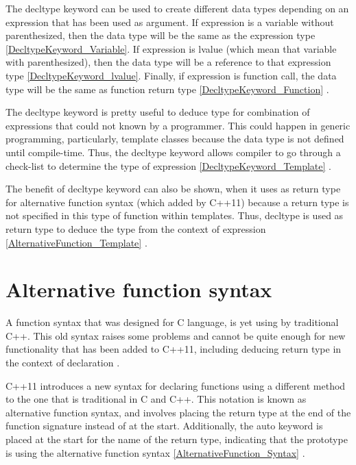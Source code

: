 \documentclass[11pt]{report}
\begin{document}
The decltype keyword can be used to create different data types depending on an expression that has been used as argument.  If expression is a variable without parenthesized, then the data type will be the same as the expression type \ref{DecltypeKeyword_Variable}. If expression is lvalue (which mean that variable with parenthesized), then the data type will be a reference to that expression type \ref{DecltypeKeyword_lvalue}. Finally, if expression is function call, the data type will be the same as function return type \ref{DecltypeKeyword_Function} \cite{Prata:2012:Cpp}.


The decltype keyword is pretty useful to deduce type for combination of expressions that could not known by a programmer. This could happen in generic programming, particularly, template classes because the data type is not defined until compile-time. Thus, the decltype keyword allows compiler to go through a check-list to determine the type of expression \ref{DecltypeKeyword_Template} \cite{Stroustrup:2012:Cpp11}.


The benefit of decltype keyword can also be shown, when it uses as return type for alternative function syntax (which added by C++11) because a return type is not specified in this type of function within templates. Thus, decltype is used as return type to deduce the type from the context of expression \ref{AlternativeFunction_Template} \cite{Gregorie:professionalcpp}. 

\section{Alternative function syntax}
\label{section: Alternative function syntax}
A function syntax that was designed for C language, is yet using by traditional C++. This old syntax raises some problems and cannot be quite enough for new functionality that has been added to C++11, including deducing return type in the context of declaration \cite{Gregorie:professionalcpp}.


C++11 introduces a new syntax for declaring functions using a different method to the one that is traditional in C and C++. This notation is known as alternative function syntax, and involves placing the return type at the end of the function signature instead of at the start. Additionally, the auto keyword is placed at the start for the name of the return type, indicating that the prototype is using the alternative function syntax \ref{AlternativeFunction_Syntax} \cite{Gregorie:professionalcpp}.
\end{document}
